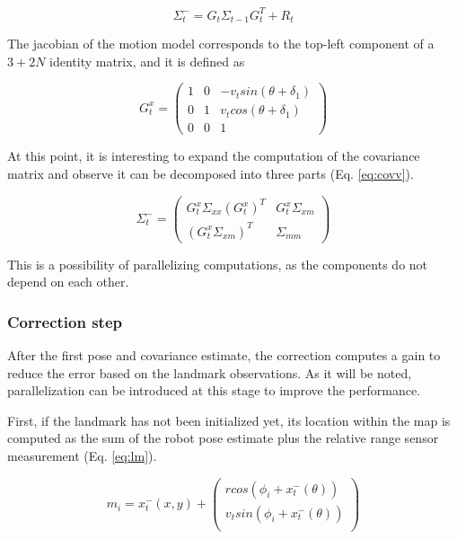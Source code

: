 \documentclass[conference]{IEEEtran}
\begin{document}
\begin{equation} \label{eq: cov}
    \Sigma_{t}^{-} = G_t \Sigma_{t - 1} G_{t}^T + R_t
\end{equation}

The jacobian of the motion model corresponds to the top-left component of a $3 + 2N$ identity matrix, and it is defined as 

$$G_t^x = \begin{pmatrix}
    1 & 0 & - v_t sin(\theta + \delta_1 ) \\
    0 & 1 &   v_t cos(\theta + \delta_1 ) \\
    0 & 0 & 1 
    \end{pmatrix}  
$$

At this point, it is interesting to expand the computation of the covariance matrix and observe it can be decomposed into three parts (Eq. \ref{eq:covv}).

\begin{equation} \label{eq:covv}
    \Sigma_{t}^{-} =  \begin{pmatrix}
    G_t^x\Sigma_{xx}(G_t^x)^T & G_t^x\Sigma_{xm} \\
    (G_t^x\Sigma_{xm})^T & \Sigma_{mm} 
    \end{pmatrix} 
\end{equation}

This is a possibility of parallelizing computations, as the components do not depend on each other.

\subsubsection{Correction step}

After the first pose and covariance estimate, the correction computes a gain to reduce the error based on the landmark observations. As it will be noted,  parallelization can be introduced at this stage to improve the performance.

First, if the landmark has not been initialized yet, its location within the map is computed as the sum of the robot pose estimate plus the relative range sensor measurement (Eq. \ref{eq:lm}).

\begin{equation} \label{eq:lm}
    m_i = x_t^-(x, y) +  \begin{pmatrix}
                                r cos(\phi_i + x_t^-(\theta)) \\
                                v_t sin(\phi_i + x_t^-(\theta)) \\
                                \end{pmatrix}  
\end{equation}
\end{document}
